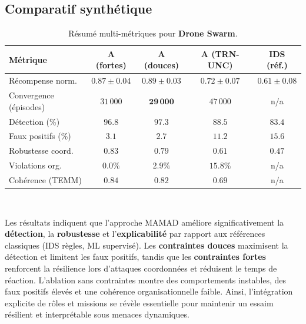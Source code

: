 \subsection*{Comparatif synthétique}

\begin{table}[h!]
  \centering
  \caption{Résumé multi-métriques pour \textbf{Drone Swarm}.}
  \label{tab:drone_summary}
  \renewcommand{\arraystretch}{1.2}
  \small
  \begin{tabular}{|l|c|c|c|c|}
    \hline
    \textbf{Métrique}      & \textbf{A (fortes)} & \textbf{A (douces)}      & \textbf{A (TRN-UNC)} & \textbf{IDS (réf.)} \\
    \hline
    Récompense norm.       & $0.87 \pm 0.04$     & $\mathbf{0.89 \pm 0.03}$ & $0.72 \pm 0.07$      & $0.61 \pm 0.08$     \\
    Convergence (épisodes) & $31\,000$           & $\mathbf{29\,000}$       & $47\,000$            & n/a                 \\
    Détection (\%)         & $96.8$              & $\mathbf{97.3}$          & $88.5$               & $83.4$              \\
    Faux positifs (\%)     & $3.1$               & $\mathbf{2.7}$           & $11.2$               & $15.6$              \\
    Robustesse coord.      & $\mathbf{0.83}$     & $0.79$                   & $0.61$               & $0.47$              \\
    Violations org.        & $\mathbf{0.0\%}$    & $2.9\%$                  & $15.8\%$             & n/a                 \\
    Cohérence (TEMM)       & $\mathbf{0.84}$     & $0.82$                   & $0.69$               & n/a                 \\
    \hline
  \end{tabular}
\end{table}

\

Les résultats indiquent que l’approche MAMAD améliore significativement la \textbf{détection}, la \textbf{robustesse} et l’\textbf{explicabilité} par rapport aux références classiques (IDS règles, ML supervisé).
Les \textbf{contraintes douces} maximisent la détection et limitent les faux positifs, tandis que les \textbf{contraintes fortes} renforcent la résilience lors d’attaques coordonnées et réduisent le temps de réaction.
L’ablation sans contraintes montre des comportements instables, des faux positifs élevés et une cohérence organisationnelle faible.
Ainsi, l’intégration explicite de rôles et missions se révèle essentielle pour maintenir un essaim résilient et interprétable sous menaces dynamiques.


